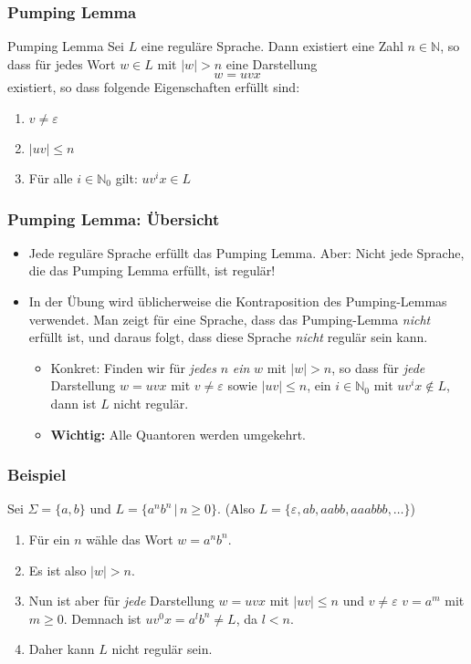 \documentclass{beamer}
\begin{document}
{%
\begin{frame}
\frametitle{Pumping Lemma}
\begin{exampleblock}{Pumping Lemma}
Sei $L$ eine reguläre Sprache. Dann existiert eine Zahl $n \in \mathbb{N}$, so dass für jedes Wort $w \in L$ mit $\left|w \right| > n$ eine Darstellung $$w = uvx$$ existiert, so dass folgende Eigenschaften erfüllt sind:

\begin{enumerate}
\item $v \neq \varepsilon$ 
\item $\left|uv\right| \leq n$ 
\item Für alle $i \in \mathbb{N}_0$ gilt: $uv^ix \in L$
\end{enumerate}
\end{exampleblock}
\end{frame}
\begin{frame}
\frametitle{Pumping Lemma: Übersicht}
\begin{itemize}
\item Jede reguläre Sprache erfüllt das Pumping Lemma. Aber: Nicht jede Sprache, die das Pumping Lemma erfüllt, ist regulär!
\item In der Übung wird üblicherweise die Kontraposition des Pumping-Lemmas verwendet. Man zeigt für eine Sprache, dass das Pumping-Lemma \emph{nicht} erfüllt ist, und daraus folgt, dass diese Sprache \emph{nicht} regulär sein kann.
\begin{itemize}
\item Konkret: Finden wir für \emph{jedes} $n$ \emph{ein} $w$ mit $\left|w\right| > n$, so dass für \emph{jede} Darstellung $w = uvx$ mit $v \neq \varepsilon$ sowie $\left|uv\right| \leq n$, ein $i \in \mathbb{N}_0$ mit $uv^ix \notin L$, dann ist $L$ nicht regulär.
\item \textbf{Wichtig:} Alle Quantoren werden umgekehrt.
\end{itemize}
\end{itemize}
\end{frame}

\begin{frame}
\frametitle{Beispiel}
Sei $\Sigma = \{a, b\}$ und $L = \{a^nb^n\,|\,n\geq0\}$. (Also $L = \{\varepsilon,ab, aabb, aaabbb, \ldots\}$)
\begin{enumerate}
\item Für ein $n$ wähle das Wort $w = a^nb^n$.
\item Es ist also $\left|w\right| > n$.
\item Nun ist aber für \emph{jede} Darstellung $w = uvx$ mit $\left|uv\right| \leq n$ und $v \neq \varepsilon$ $v = a^m$ mit $m \geq 0$. Demnach ist $uv^0x = a^lb^n \neq L$, da $l < n$.
\item Daher kann $L$ nicht regulär sein.
\end{enumerate}


\end{frame}}
\end{document}
